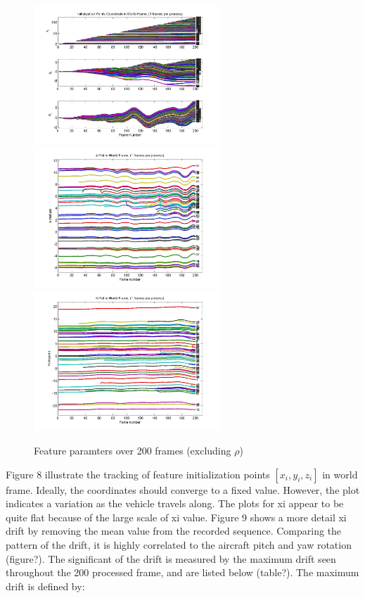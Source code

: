\begin{figure}[h]
\centering
\includegraphics[width=7cm,keepaspectratio=true]{./Figures/fltfig/initPoint-1fpp-200f2p.jpg}
\includegraphics[width=7cm,keepaspectratio=true]{./Figures/fltfig/phi-1fpp-200f2p.jpg}
\includegraphics[width=7cm,keepaspectratio=true]{./Figures/fltfig/theta-1fpp-200f2p.jpg}
\caption{Feature paramters over 200 frames (excluding $\rho$)}
\label{fltfig:2}
\end{figure}

Figure 8 illustrate the tracking of feature initialization 
points $[x_{i}, y_{i}, z_{i}]$ in world frame. Ideally, the 
coordinates should converge to a fixed value. However, the plot 
indicates a variation as the vehicle travels along. The plots for xi 
appear to be quite flat because of the large scale of xi value. Figure 9 
shows a more detail xi drift by removing the mean value from the 
recorded sequence. Comparing the pattern of the drift, it is highly 
correlated to the aircraft pitch and yaw rotation (figure?). The 
significant of the drift is measured by the maximum drift seen 
throughout the 200 processed frame, and are listed below (table?). The 
maximum drift is defined by:

